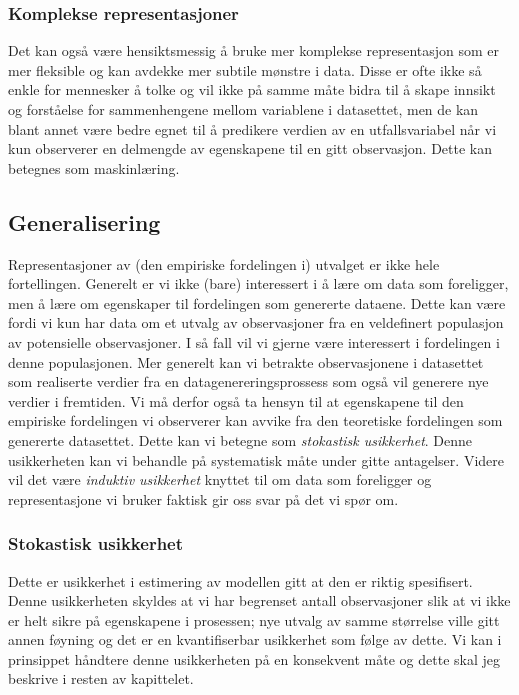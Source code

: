 \subsubsection{Komplekse representasjoner}
Det kan også være hensiktsmessig å bruke mer komplekse representasjon som er mer fleksible og kan avdekke mer subtile mønstre i data. Disse er ofte ikke så enkle for mennesker å tolke og vil ikke på samme måte bidra til å skape innsikt og forståelse for sammenhengene mellom variablene i datasettet, men de kan blant annet være bedre egnet til å predikere verdien av en utfallsvariabel når vi kun observerer en delmengde av egenskapene til en gitt observasjon. Dette kan betegnes som maskinlæring. 
\subsection{Generalisering}
Representasjoner av (den empiriske fordelingen i) utvalget er ikke hele fortellingen. Generelt er vi ikke (bare) interessert i å lære om data som foreligger, men å lære om egenskaper til fordelingen som genererte dataene. Dette kan være fordi vi kun har data om et utvalg av observasjoner fra en veldefinert populasjon av potensielle observasjoner. I så fall vil vi gjerne være interessert i fordelingen i denne populasjonen. Mer generelt kan vi betrakte observasjonene i datasettet som realiserte verdier fra en datagenereringsprossess som også vil generere nye verdier i fremtiden. Vi må derfor også ta hensyn til at egenskapene til den empiriske fordelingen vi observerer kan avvike fra den teoretiske fordelingen som genererte datasettet. Dette kan vi betegne som \textit{stokastisk usikkerhet}. Denne usikkerheten kan vi behandle på systematisk måte under gitte antagelser. Videre vil det være \textit{induktiv usikkerhet} knyttet til om data som foreligger og representasjone vi bruker faktisk gir oss svar på det vi spør om.
\subsubsection{Stokastisk usikkerhet}
Dette er usikkerhet i estimering av modellen gitt at den er riktig spesifisert. Denne usikkerheten skyldes at vi har begrenset antall observasjoner slik at vi ikke er helt sikre på egenskapene i prosessen; nye utvalg av samme størrelse ville gitt annen føyning og det er en kvantifiserbar usikkerhet som følge av dette. Vi kan i prinsippet håndtere denne usikkerheten på en konsekvent måte og dette skal jeg beskrive i resten av kapittelet.

